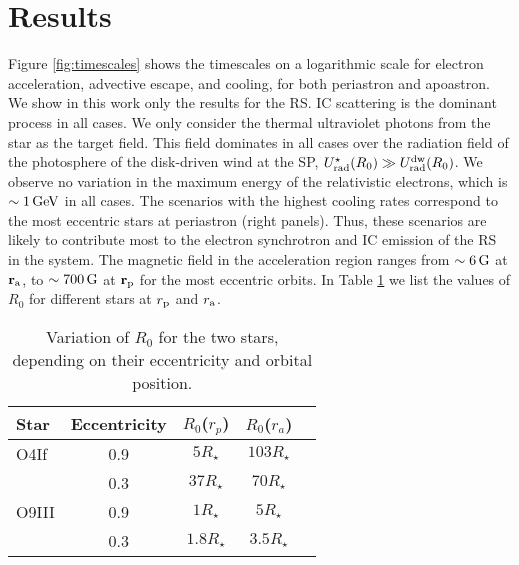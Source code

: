 \documentclass[baaa]{baaa}
\begin{document}
\section{Results}\label{S_results}

Figure \ref{fig:timescales} shows the timescales on a logarithmic scale for electron acceleration, advective escape, and cooling, for both periastron and apoastron. We show in this work only the results for the RS. IC scattering is the dominant process in all cases. We only consider the thermal ultraviolet photons from the star as the target field. This field dominates in all cases over the radiation field of the photosphere of the disk-driven wind at the SP, $U_{\rm rad}^{\star}(R_0)\gg U_{\rm rad}^{\rm dw}(R_0)$.
We observe no variation in the maximum energy of the relativistic electrons, which is $\sim 1\,{\rm GeV}$ in all cases. The scenarios with the highest cooling rates correspond to the most eccentric stars at periastron (right panels). Thus, these scenarios are likely to contribute most to the electron synchrotron and IC emission of the RS in the system. The magnetic field in the acceleration region ranges from $\sim 6\,{\rm G}$ at ${\mathbf r_{\rm a}}$, to $\sim 700\,{\rm G}$ at $ {\mathbf r_{\rm p}}$ for the most eccentric orbits.
In Table \ref{table_2} we list the values of $R_0$ for different stars at $r_{\rm p}$ and $r_{\rm a}$.



\begin{table}[h!]
\centering
\begin{tabular}{lcccc}
\hline\hline\noalign{\smallskip}
\!\!Star & \!\!Eccentricity\!\! & \!\!\(R_0\)($r_p$)\!\! & \!\!\(R_0\)($r_{a}$)\!\! \\
\hline\noalign{\smallskip}
\!\!O4If & 0.9 & $5 R_\star$ & $103 R_\star$ \\
         & 0.3 & $37 R_\star$ & $70 R_\star$ \\
\hline\noalign{\smallskip}
\!\!O9III & 0.9 & $1 R_\star$ & $5 R_\star$ \\
          & 0.3 & $1.8 R_\star$ & $3.5 R_\star$ \\
\hline
\end{tabular}
\caption{Variation of $R_0$ for the two stars, depending on their eccentricity and orbital position.}
\label{table_2}
\end{table}
\end{document}
